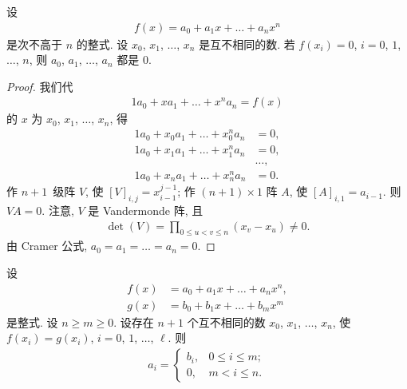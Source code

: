 \documentclass[../libro.tex]{subfiles}
\begin{document}
\begin{theorem}
    设
    \begin{align*}
        f(x) = a_0 + a_1 x + \dots + a_n x^n
    \end{align*}
    是次不高于 \(n\) 的整式.
    设 \(x_0\), \(x_1\), \(\dots\), \(x_n\) 是互不相同的数.
    若 \(f(x_i) = 0\), \(i = 0\), \(1\), \(\dots\), \(n\),
    则 \(a_0\), \(a_1\), \(\dots\), \(a_n\) 都是 \(0\).
\end{theorem}

\begin{proof}
    我们代
    \begin{align*}
        1 a_0 + x a_1 + \dots + x^n a_n = f(x)
    \end{align*}
    的 \(x\) 为 \(x_0\), \(x_1\), \(\dots\), \(x_n\),
    得
    \begin{align*}
        1 a_0 + x_0 a_1 + \dots + x_0^n a_n & = 0, \\
        1 a_0 + x_1 a_1 + \dots + x_1^n a_n & = 0, \\
        & \dots, \\
        1 a_0 + x_n a_1 + \dots + x_n^n a_n & = 0.
    \end{align*}
    作 \(n + 1\)~级阵 \(V\), 使 \([V]_{i,j} = x_{i-1}^{j-1}\);
    作 \((n + 1) \times 1\) 阵 \(A\), 使 \([A]_{i,1} = a_{i-1}\).
    则 \(V A = 0\).
    注意, \(V\) 是 Vandermonde 阵, 且
    \begin{align*}
        \det {(V)} = \prod_{0 \leq u < v \leq n} {(x_v - x_u)} \neq 0.
    \end{align*}
    由 Cramer 公式, \(a_0 = a_1 = \dots = a_n = 0\).
\end{proof}

\begin{theorem}
    设
    \begin{align*}
        f(x) & = a_0 + a_1 x + \dots + a_n x^n, \\
        g(x) & = b_0 + b_1 x + \dots + b_m x^m
    \end{align*}
    是整式.
    设 \(n \geq m \geq 0\).
    设存在 \(n + 1\) 个互不相同的数
    \(x_0\), \(x_1\), \(\dots\), \(x_n\),
    使 \(f(x_i) = g(x_i)\), \(i = 0\), \(1\), \(\dots\), \(\ell\).
    则
    \begin{align*}
        a_i =
        \begin{cases}
            b_i, & 0 \leq i \leq m; \\
            0,   & m < i \leq n.
        \end{cases}
    \end{align*}
\end{theorem}
\end{document}
